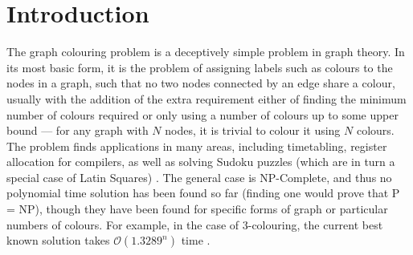 



\section{\label{intro}Introduction}

The graph colouring problem is a deceptively simple problem in graph theory.  In its most basic form, it is the problem of assigning labels such as colours to the nodes in a graph, such that no two nodes connected by an edge share a colour, usually with the addition of the extra requirement either of finding the minimum number of colours required or only using a number of colours up to some upper bound --- for any graph with \(N\) nodes, it is trivial to colour it using \(N\) colours.  The problem finds applications in many areas, including timetabling, register allocation for compilers, as well as solving Sudoku puzzles (which are in turn a special case of Latin Squares) \cite{Lewis2016}.  The general case is NP-Complete, and thus no polynomial time solution has been found so far (finding one would prove that P = NP), though they have been found for specific forms of graph or particular numbers of colours.  For example, in the case of 3-colouring, the current best known solution takes \(\mathcal{O}(1.3289^n)\) time \cite{Beigel2005}.

